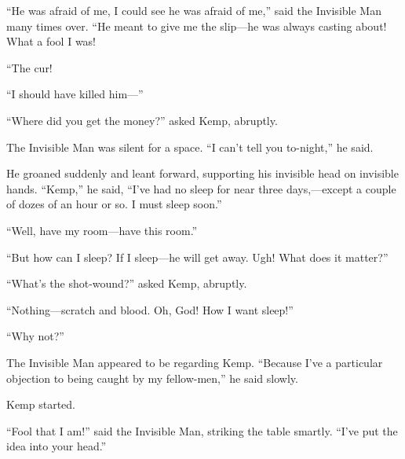 “He was afraid of me, I could see he was afraid of me,” said the Invisible Man many times over. “He meant to give me the slip—he was always casting about! What a fool I was!

“The cur!

“I should have killed him—”

“Where did you get the money?” asked Kemp, abruptly.

The Invisible Man was silent for a space. “I can’t tell you to-night,” he said.

He groaned suddenly and leant forward, supporting his invisible head on invisible hands. “Kemp,” he said, “I’ve had no sleep for near three days,—except a couple of dozes of an hour or so. I must sleep soon.”

“Well, have my room—have this room.”

“But how can I sleep? If I sleep—he will get away. Ugh! What does it matter?”

“What’s the shot-wound?” asked Kemp, abruptly.

“Nothing—scratch and blood. Oh, God! How I want sleep!”

“Why not?”

The Invisible Man appeared to be regarding Kemp. “Because I’ve a particular objection to being caught by my fellow-men,” he said slowly.

Kemp started.

“Fool that I am!” said the Invisible Man, striking the table smartly. “I’ve put the idea into your head.”